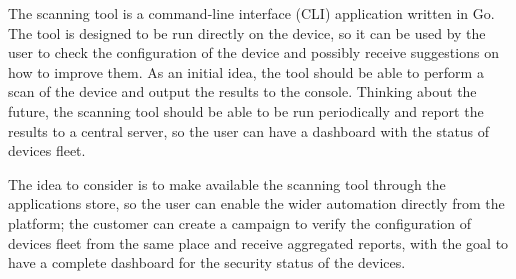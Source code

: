 The scanning tool is a command-line interface (CLI) application written in Go. The tool is designed to be run directly on the device, so it can be used by the user to check the configuration of the device and possibly receive suggestions on how to improve them. As an initial idea, the tool should be able to perform a scan of the device and output the results to the console. Thinking about the future, the scanning tool should be able to be run periodically and report the results to a central server, so the user can have a dashboard with the status of devices fleet.

The idea to consider is to make available the scanning tool through the applications store, so the user can enable the wider automation directly from the platform; the customer can create a campaign to verify the configuration of devices fleet from the same place and receive aggregated reports, with the goal to have a complete dashboard for the security status of the devices.
